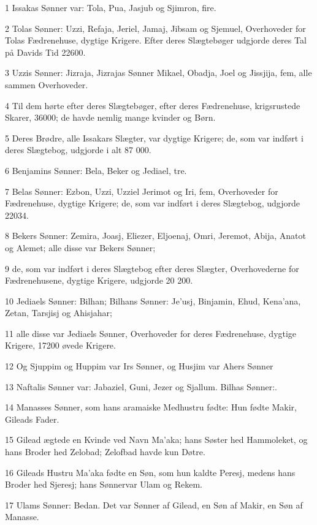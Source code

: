 \par 1 Issakas Sønner var: Tola, Pua, Jasjub og Sjimron, fire.
\par 2 Tolas Sønner: Uzzi, Refaja, Jeriel, Jamaj, Jibsam og Sjemuel, Overhoveder for Tolas Fædrenehuse, dygtige Krigere. Efter deres Slægtebøger udgjorde deres Tal på Davids Tid 22600.
\par 3 Uzzis Sønner: Jizraja, Jizrajas Sønner Mikael, Obadja, Joel og Jissjija, fem, alle sammen Overhoveder.
\par 4 Til dem hørte efter deres Slægtebøger, efter deres Fædrenehuse, krigsrustede Skarer, 36000; de havde nemlig mange kvinder og Børn.
\par 5 Deres Brødre, alle Issakars Slægter, var dygtige Krigere; de, som var indført i deres Slægtebog, udgjorde i alt 87 000.
\par 6 Benjamins Sønner: Bela, Beker og Jediael, tre.
\par 7 Belas Sønner: Ezbon, Uzzi, Uzziel Jerimot og Iri, fem, Overhoveder for Fædrenehuse, dygtige Krigere; de, som var indført i deres Slægtebog, udgjorde 22034.
\par 8 Bekers Sønner: Zemira, Joasj, Eliezer, Eljoenaj, Omri, Jeremot, Abija, Anatot og Alemet; alle disse var Bekers Sønner;
\par 9 de, som var indført i deres Slægtebog efter deres Slægter, Overhovederne for Fædrenehusene, dygtige Krigere, udgjorde 20 200.
\par 10 Jediaels Sønner: Bilhan; Bilhans Sønner: Je'usj, Binjamin, Ehud, Kena'ana, Zetan, Tarsjisj og Ahisjahar;
\par 11 alle disse var Jediaels Sønner, Overhoveder for deres Fædrenehuse, dygtige Krigere, 17200 øvede Krigere.
\par 12 Og Sjuppim og Huppim var Irs Sønner, og Husjim var Ahers Sønner
\par 13 Naftalis Sønner var: Jabaziel, Guni, Jezer og Sjallum. Bilhas Sønner:.
\par 14 Manasses Sønner, som hans aramaiske Medhustru fødte: Hun fødte Makir, Gileads Fader.
\par 15 Gilead ægtede en Kvinde ved Navn Ma'aka; hans Søster hed Hammoleket, og hans Broder hed Zelobad; Zelofbad havde kun Døtre.
\par 16 Gileads Hustru Ma'aka fødte en Søn, som hun kaldte Peresj, medens hans Broder hed Sjeresj; hans Sønnervar Ulam og Rekem.
\par 17 Ulams Sønner: Bedan. Det var Sønner af Gilead, en Søn af Makir, en Søn af Manasse.
